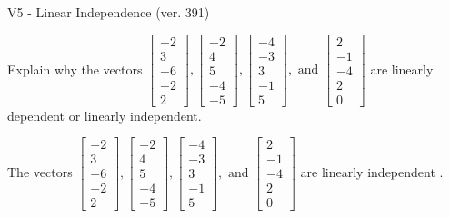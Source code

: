 \begin{exercise}
  \begin{exerciseTitle}V5 - Linear Independence (ver. 391)\end{exerciseTitle}
  \begin{exerciseStatement}
    Explain why the vectors \(\left[\begin{array}{r}
-2 \\
3 \\
-6 \\
-2 \\
2
\end{array}\right] , \left[\begin{array}{r}
-2 \\
4 \\
5 \\
-4 \\
-5
\end{array}\right] , \left[\begin{array}{r}
-4 \\
-3 \\
3 \\
-1 \\
5
\end{array}\right] , \text{ and } \left[\begin{array}{r}
2 \\
-1 \\
-4 \\
2 \\
0
\end{array}\right]\) are linearly dependent or linearly independent.	


  \end{exerciseStatement}
  \begin{exerciseAnswer}
   The vectors \(\left[\begin{array}{r}
-2 \\
3 \\
-6 \\
-2 \\
2
\end{array}\right] , \left[\begin{array}{r}
-2 \\
4 \\
5 \\
-4 \\
-5
\end{array}\right] , \left[\begin{array}{r}
-4 \\
-3 \\
3 \\
-1 \\
5
\end{array}\right] , \text{ and } \left[\begin{array}{r}
2 \\
-1 \\
-4 \\
2 \\
0
\end{array}\right]\) are 
  	 linearly independent  .
  


  \end{exerciseAnswer}
\end{exercise}